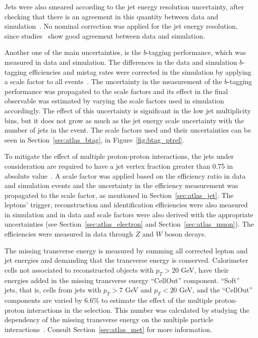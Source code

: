 Jets were also smeared according to the jet energy resolution uncertainty,
after checking that there is an agreement in this quantity between data and simulation~\cite{ttjets_jer,jetreso2010}. No nominal correction was
applied for the jet energy resolution, since studies~\cite{jetreso2010}
show good agreement between data and simulation.


Another one of the main uncertainties, is the $b$-tagging performance, which was measured in data and simulation. The differences in the data and simulation $b$-tagging
efficiencies and mistag rates were corrected in the simulation by applying a scale factor to all events~\cite{mv1note}.
The uncertainty in the measurement of the $b$-tagging performance was propagated to the scale factors and its effect in the final observable was estimated by varying the
scale factors used in simulation accordingly. The effect of this uncertainty is significant in the low jet multiplicity bins, but it does not grow as much as the jet energy
scale uncertainty with the number of jets in the event. The scale factors used and their uncertainties can be seen in Section~\ref{sec:atlas_btag},
in Figure~\ref{fig:btag_ptrel}.

To mitigate the effect of multiple proton-proton interactions, the jets under consideration are required to have a jet vertex fraction greater than 0.75 in
absolute value~\cite{ttjets_confnote}.
A scale factor was applied based on the efficiency ratio in data and simulation events and the uncertainty in the efficiency measurement was propagated
to the scale factor, as mentioned in Section~\ref{sec:atlas_jet}.
The leptons' trigger, reconstruction and identification efficiencies were also measured in simulation and in data and scale factors were also derived with the appropriate
uncertainties (see Section~\ref{sec:atlas_electron} and Section~\ref{sec:atlas_muon}). The efficiencies were measured in data through $Z$ and $W$ boson decays.

The missing transverse energy is measured by summing all corrected lepton and jet energies and demanding that the transverse energy is conserved. Calorimeter cells
not associated to reconstructed objects with $p_T > 20$ GeV, have their energies added in the missing transverse energy ``CellOut'' component.
``Soft'' jets, that is, cells from jets with $p_T > 7$ GeV and $p_T < 20$ GeV, and the ``CellOut'' components are varied by 6.6\% to estimate the effect of the multiple
proton-proton interactions in the selection. This number was calculated by studying the dependency of the missing transverse energy on the multiple particle
interactions~\cite{ttjets_confnote}. Consult Section~\ref{sec:atlas_met} for more information.

